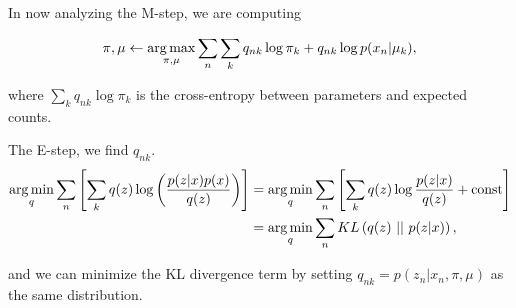 \documentclass{article}
\begin{document}
\smallskip

In now analyzing the M-step, we are computing 

\begin{align*}
\pi, \mu \gets \argmax_{\pi, \mu} \sum_n \sum_k q_{nk} \log \pi_k + q_{nk} \log p(x_n |  \mu_k),	
\end{align*}

where $\displaystyle \sum_k q_{nk} \log \pi_k$ is the cross-entropy between parameters and expected counts.

The E-step, we find $q_{nk}$.  
\begin{align*}
\argmin_{q} \sum_{n} \left[ \sum_k q(z) \log \left(\frac{p(z|x) p(x)}{q(z)} \right) \right]	&= \argmin_q \sum_{n} \left[ \sum_k q(z) \log \frac{p(z|x)}{q(z)} + \text{const} \right] \\
&= \argmin_q \sum_n KL\left( q(z)\ ||\ p(z|x) \right),
\end{align*}

and we can minimize the KL divergence term by setting $q_{nk} = p(z_n | x_n, \pi,\mu)$ as the same distribution.
\end{document}
